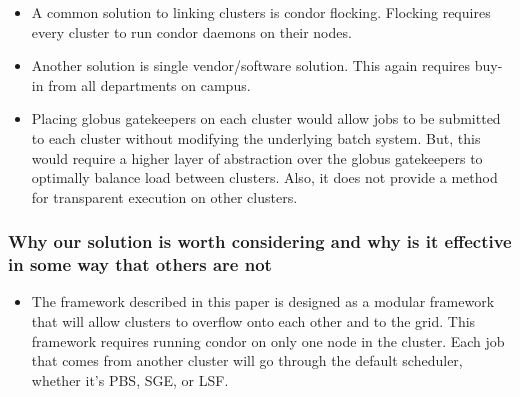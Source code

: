 \documentclass[11pt]{article}
\begin{document}
\begin{itemize}

\item 
A common solution to linking clusters is condor flocking.  Flocking requires every cluster to run condor daemons on their nodes.  

\item
Another solution is single vendor/software solution.  This again requires buy-in from all departments on campus.

\item
Placing globus gatekeepers on each cluster would allow jobs to be submitted to each cluster without modifying the underlying batch system.  But, this would require a higher layer of abstraction over the globus gatekeepers to optimally balance load between clusters.  Also, it does not provide a method for transparent execution on other clusters.



\end{itemize}


\subsubsection* {Why our solution is worth considering and why is it effective
in some way that others are not}

\begin{itemize}
\item The framework described in this paper is designed as a modular framework that will allow clusters to overflow onto each other and to the grid.  This framework requires running condor on only one node in the cluster.  Each job that comes from another cluster will go through the default scheduler, whether it's PBS, SGE, or LSF.


\end{itemize}
\end{document}
